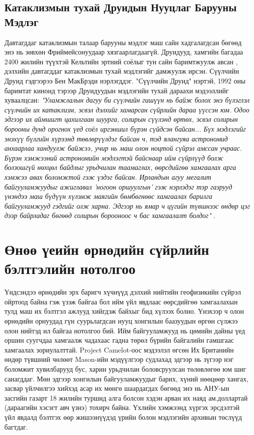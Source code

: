 \documentclass[10pt,twocolumn,letterpaper]{article}
\begin{document}
\subsection{Катаклизмын тухай Друидын Нууцлаг Барууны Мэдлэг}

Давтагддаг катаклизмын талаар барууны мэдлэг маш сайн хадгалагдсан бөгөөд энэ нь зөвхөн Фриймейсонуудаар хязгаарлагдаагүй. Друидууд, хамгийн багадаа 2400 жилийн түүхтэй Кельтийн эртний соёлыг тун сайн баримтжуулж авсан \cite{7}, дэлхийн давтагддаг катаклизмын тухай мэдлэгийг дамжуулж ирсэн. Сүүлчийн Друид гэдгээрээ Бен МакБрэди нэрлэгддэг. "Сүүлчийн Друид" нэртэй, 1992 оны баримтат кинонд тэрээр Друидуудын мэдлэгийн тухай дараахи мэдээллийг хуваалцсан: \textit{"Уламжлалын дагуу би сүүлчийн гишүүн нь байж болох энэ бүлэглэл сүүлчийн их катаклизм, эсвэл дэлхийг хамарсан сүйрлийн дараа үүссэн юм. Одоо эдгээр их аймшигт цахилгаан шуурга, солирын сүүлэнд өртөх, эсвэл солирын борооны дунд орогнох үед соёл иргэншил бүрэн сүйдсэн байсан... Бүх мэдлэгийг энэхүү бүлгийн хүрээнд төвлөрүүлдэг байсан ч, тэд ялангуяа астрономид анхаарлаа хандуулж байжээ, учир нь маш олон ноцтой сүйрэл амссан учраас. Бүрэн хэмжээний астрономийн мэдлэгтэй байснаар ийм сүйрлүүд болж болзошгүй нөхцөл байдлыг урьдчилан таамаглах, өөрсдийгөө хамгаалах арга хэмжээ авах боломжтой гэж үздэг байсан. Ирландын агуу мегалит байгууламжуудыг ажиглавал 'ногоон оршуулгын' гэж нэрлэдэг тэр газрууд үнэндээ маш бүдүүн хүлэмж маягийн бөмбөгнөөс хамгаалах барилга байгууламжууд гэдгийг олж харна. Эдгээр нь ямар ч цүгийн түвшнээс өндөр цэг дээр байрладаг бөгөөд солирын борооноос ч бас хамгаалалт болдог"} \cite{8,9}.

\section{Өнөө үеийн өрнөдийн сүйрлийн бэлтгэлийн нотолгоо}

Үндсэндээ өрнөдийн эрх баригч хүчнүүд дэлхий нийтийн геофизикийн сүйрэл ойртоод байна гэж үзэж байгаа бол ийм үйл явдлаас өөрсдийгөө хамгаалахын тулд маш их бэлтгэл ажлууд хийгдэж байхыг бид хүлээх болно. Үнэхээр ч олон өрнөдийн орнуудад гүн суурьлагдсан нууц хонгилын баазуудын өргөн сүлжээ олон нийтэд ил байгаа нотолгоо бий. Ийм байгууламжууд нь цөмийн дайны үед оршин суугчдаа хамгаалж чадахаас гадна төрөл бүрийн байгалийн гамшгаас хамгаалах зориулалттай. Project Camelot\cite{4,6}-оос мэдээлэл өгсөн Их Британийн өндөр түвшний чөлөөт Mason-ийн мэдүүлгээр судлахад эдгээр нь зүгээр нэг боломжит хувилбарууд бус, харин урьдчилан боловсруулсан төлөвлөгөө юм шиг санагддаг. Мөн эдгээр хонгилын байгууламжуудыг барих, хүний нөөцөөр хангах, засвар үйлчилгээ хийхэд асар их мөнгө шаардагдах бөгөөд энэ нь АНУ-ын засгийн газарт 18 жилийн туршид алга болсон хэдэн арван их наяд ам.доллартай (дараагийн хэсэгт авч үзнэ) \cite{11,12,13} тохирч байна. Үхлийн хэмжээнд хүргэх эрсдэлтэй үйл явдалд бэлтгэх өөр жишээнүүдэд үрийн болон мэдлэгийн архивын төслүүд багтдаг.
\end{document}
